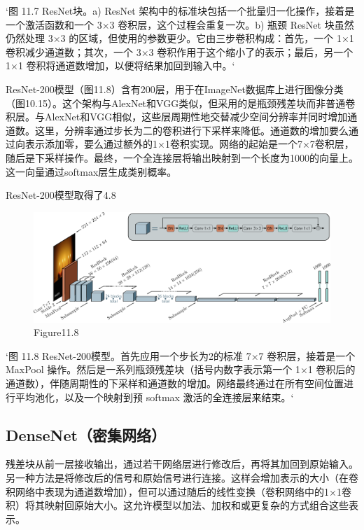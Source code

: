 `图 11.7 ResNet块。a) ResNet 架构中的标准块包括一个批量归一化操作，接着是一个激活函数和一个 3×3 卷积层，这个过程会重复一次。b) 瓶颈 ResNet 块虽然仍然处理 3×3 的区域，但使用的参数更少。它由三步卷积构成：首先，一个 1×1 卷积减少通道数；其次，一个 3×3 卷积作用于这个缩小了的表示；最后，另一个 1×1 卷积将通道数增加，以便将结果加回到输入中。`

ResNet-200模型（图11.8）含有200层，用于在ImageNet数据库上进行图像分类（图10.15）。这个架构与AlexNet和VGG类似，但采用的是瓶颈残差块而非普通卷积层。与AlexNet和VGG相似，这些层周期性地交替减少空间分辨率并同时增加通道数。这里，分辨率通过步长为二的卷积进行下采样来降低。通道数的增加要么通过向表示添加零，要么通过额外的1×1卷积实现。网络的起始是一个7×7卷积层，随后是下采样操作。最终，一个全连接层将输出映射到一个长度为1000的向量上。这一向量通过softmax层生成类别概率。

ResNet-200模型取得了4.8%

\begin{figure}[h!]
\centering
\includegraphics[width=0.7\linewidth]{png/chapter11/ResidualResnet2.png}
\caption{Figure11.8}
\end{figure}

`图 11.8 ResNet-200模型。首先应用一个步长为2的标准 7×7 卷积层，接着是一个 MaxPool 操作。然后是一系列瓶颈残差块（括号内数字表示第一个 1×1 卷积后的通道数），伴随周期性的下采样和通道数的增加。网络最终通过在所有空间位置进行平均池化，以及一个映射到预 softmax 激活的全连接层来结束。`

\subsection{DenseNet（密集网络）}
残差块从前一层接收输出，通过若干网络层进行修改后，再将其加回到原始输入。另一种方法是将修改后的信号和原始信号进行连接。这样会增加表示的大小（在卷积网络中表现为通道数增加），但可以通过随后的线性变换（卷积网络中的1×1卷积）将其映射回原始大小。这允许模型以加法、加权和或更复杂的方式组合这些表示。

